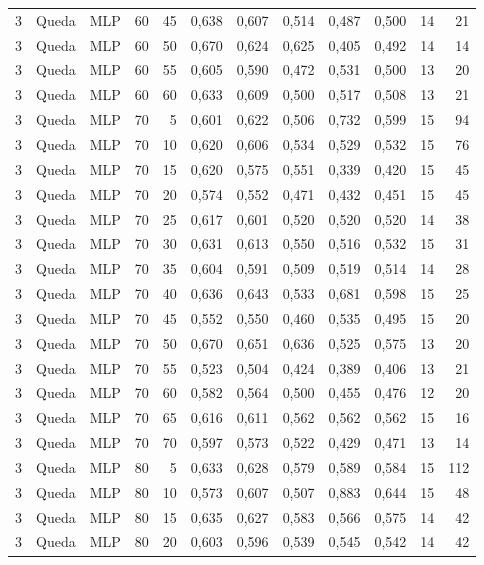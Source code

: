 \begin{longtable}{@{}rllrrrrrrrrr@{}}
3 & Queda & MLP & 60 & 45 & 0,638 & 0,607 & 0,514 & 0,487 & 0,500 & 14 & 21 \\
3 & Queda & MLP & 60 & 50 & 0,670 & 0,624 & 0,625 & 0,405 & 0,492 & 14 & 14 \\
3 & Queda & MLP & 60 & 55 & 0,605 & 0,590 & 0,472 & 0,531 & 0,500 & 13 & 20 \\
3 & Queda & MLP & 60 & 60 & 0,633 & 0,609 & 0,500 & 0,517 & 0,508 & 13 & 21 \\
3 & Queda & MLP & 70 & 5 & 0,601 & 0,622 & 0,506 & 0,732 & 0,599 & 15 & 94 \\
3 & Queda & MLP & 70 & 10 & 0,620 & 0,606 & 0,534 & 0,529 & 0,532 & 15 & 76 \\
3 & Queda & MLP & 70 & 15 & 0,620 & 0,575 & 0,551 & 0,339 & 0,420 & 15 & 45 \\
3 & Queda & MLP & 70 & 20 & 0,574 & 0,552 & 0,471 & 0,432 & 0,451 & 15 & 45 \\
3 & Queda & MLP & 70 & 25 & 0,617 & 0,601 & 0,520 & 0,520 & 0,520 & 14 & 38 \\
3 & Queda & MLP & 70 & 30 & 0,631 & 0,613 & 0,550 & 0,516 & 0,532 & 15 & 31 \\
3 & Queda & MLP & 70 & 35 & 0,604 & 0,591 & 0,509 & 0,519 & 0,514 & 14 & 28 \\
3 & Queda & MLP & 70 & 40 & 0,636 & 0,643 & 0,533 & 0,681 & 0,598 & 15 & 25 \\
3 & Queda & MLP & 70 & 45 & 0,552 & 0,550 & 0,460 & 0,535 & 0,495 & 15 & 20 \\
3 & Queda & MLP & 70 & 50 & 0,670 & 0,651 & 0,636 & 0,525 & 0,575 & 13 & 20 \\
3 & Queda & MLP & 70 & 55 & 0,523 & 0,504 & 0,424 & 0,389 & 0,406 & 13 & 21 \\
3 & Queda & MLP & 70 & 60 & 0,582 & 0,564 & 0,500 & 0,455 & 0,476 & 12 & 20 \\
3 & Queda & MLP & 70 & 65 & 0,616 & 0,611 & 0,562 & 0,562 & 0,562 & 15 & 16 \\
3 & Queda & MLP & 70 & 70 & 0,597 & 0,573 & 0,522 & 0,429 & 0,471 & 13 & 14 \\
3 & Queda & MLP & 80 & 5 & 0,633 & 0,628 & 0,579 & 0,589 & 0,584 & 15 & 112 \\
3 & Queda & MLP & 80 & 10 & 0,573 & 0,607 & 0,507 & 0,883 & 0,644 & 15 & 48 \\
3 & Queda & MLP & 80 & 15 & 0,635 & 0,627 & 0,583 & 0,566 & 0,575 & 14 & 42 \\
3 & Queda & MLP & 80 & 20 & 0,603 & 0,596 & 0,539 & 0,545 & 0,542 & 14 & 42 \\

\end{longtable}
